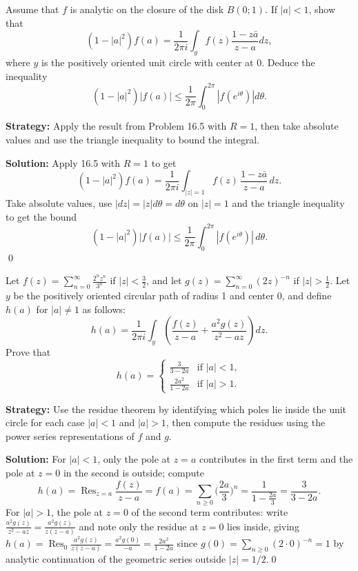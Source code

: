 \begin{problembox}
\begin{problemstatement}
Assume that \( f \) is analytic on the closure of the disk \( B(0; 1) \). If \( |a| < 1 \), show that
\[(1 - |a|^2)f(a) = \frac{1}{2\pi i} \int_{y} f(z) \frac{1 - z\bar{a}}{z - a} dz,\]
where \( y \) is the positively oriented unit circle with center at 0. Deduce the inequality
\[(1 - |a|^2) |f(a)| \leq \frac{1}{2\pi} \int_0^{2\pi} |f(e^{i\theta})| d\theta.\]
\end{problemstatement}
\end{problembox}

\noindent\textbf{Strategy:} Apply the result from Problem 16.5 with \( R = 1 \), then take absolute values and use the triangle inequality to bound the integral.

\bigskip\noindent\textbf{Solution:}
Apply 16.5 with $R=1$ to get
\[(1-|a|^2)f(a)=\frac{1}{2\pi i}\int_{|z|=1} f(z)\,\frac{1-z\bar a}{z-a}\,dz.\]
Take absolute values, use $|dz|=|z|d\theta=d\theta$ on $|z|=1$ and the triangle inequality to get the bound
\[(1-|a|^2)|f(a)|\le \frac{1}{2\pi}\int_0^{2\pi}|f(e^{i\theta})|\,d\theta.\]\qed


\begin{problembox}
\begin{problemstatement}
Let \( f(z) = \sum_{n=0}^{\infty} \frac{2^n z^n}{3^n} \) if \( |z| < \frac{3}{2} \), and let \( g(z) = \sum_{n=0}^{\infty} (2z)^{-n} \) if \( |z| > \frac{1}{2} \). Let \( y \) be the positively oriented circular path of radius 1 and center 0, and define \( h(a) \) for \( |a| \neq 1 \) as follows:
\[h(a) = \frac{1}{2\pi i} \int_y \left( \frac{f(z)}{z - a} + \frac{a^2 g(z)}{z^2 - az} \right) dz.\]
Prove that
\[h(a) = \begin{cases} 
\frac{3}{3 - 2a} & \text{if } |a| < 1, \\ 
\frac{2a^2}{1 - 2a} & \text{if } |a| > 1.
\end{cases}\]
\end{problemstatement}
\end{problembox}

\noindent\textbf{Strategy:} Use the residue theorem by identifying which poles lie inside the unit circle for each case \( |a| < 1 \) and \( |a| > 1 \), then compute the residues using the power series representations of \( f \) and \( g \).

\bigskip\noindent\textbf{Solution:}
For $|a|<1$, only the pole at $z=a$ contributes in the first term and the pole at $z=0$ in the second is outside; compute
\[h(a)=\operatorname{Res}_{z=a}\frac{f(z)}{z-a}=f(a)=\sum_{n\ge0}\Big(\frac{2a}{3}\Big)^n=\frac{1}{1-\frac{2a}{3}}=\frac{3}{3-2a}.
\]
For $|a|>1$, the pole at $z=0$ of the second term contributes: write $\frac{a^2g(z)}{z^2-az}=\frac{a^2g(z)}{z(z-a)}$ and note only the residue at $z=0$ lies inside, giving $h(a)=\operatorname{Res}_{0}\frac{a^2g(z)}{z(z-a)}=\frac{a^2g(0)}{-a}=\frac{2a^2}{1-2a}$ since $g(0)=\sum_{n\ge0} (2\cdot0)^{-n}=1$ by analytic continuation of the geometric series outside $|z|=1/2$.\qed
